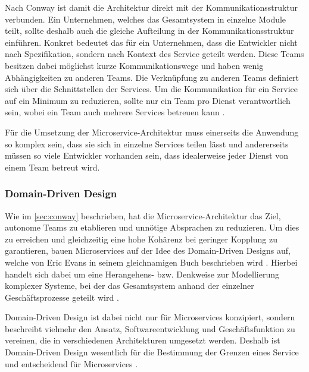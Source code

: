 Nach Conway ist damit die Architektur direkt mit der Kommunikationsstruktur verbunden. Ein Unternehmen, welches das Gesamtsystem in einzelne Module teilt, sollte deshalb auch die gleiche Aufteilung in der Kommunikationsstruktur einführen. Konkret bedeutet das für ein Unternehmen, dass die Entwickler nicht nach Spezifikation, sondern nach Kontext des Service geteilt werden. Diese Teams besitzen dabei möglichst kurze Kommunikationswege und haben wenig Abhängigkeiten zu anderen Teams. Die Verknüpfung zu anderen Teams definiert sich über die Schnittstellen der Services.
Um die Kommunikation für ein Service auf ein Minimum zu reduzieren, sollte nur ein Team pro Dienst verantwortlich sein, wobei ein Team auch mehrere Services betreuen kann \parencite[vgl.][Kap. 4.2]{wolff_microservices_2018}. 

Für die Umsetzung der Microservice-Architektur muss einerseits die Anwendung so komplex sein, dass sie sich in einzelne Services teilen lässt und andererseits müssen so viele Entwickler vorhanden sein, dass idealerweise jeder Dienst von einem Team betreut wird.

\subsubsection{Domain-Driven Design}
\label{sec:ddd}

Wie im \cref{sec:conway} beschrieben, hat die Microservice-Architektur das Ziel, autonome Teams zu etablieren und unnötige Absprachen zu reduzieren. Um dies zu erreichen und gleichzeitig eine hohe Kohärenz bei geringer Kopplung zu garantieren, bauen Microservices auf der Idee des Domain-Driven Designs auf, welche von Eric Evans in seinem gleichnamigen Buch beschrieben wird \parencite[vgl.][Kap. 2.4]{newman_monolith_2019}. Hierbei handelt sich dabei um eine Herangehens- bzw. Denkweise zur Modellierung komplexer Systeme, bei der das Gesamtsystem anhand der einzelner Geschäftsprozesse geteilt wird \parencite[vgl.][S. xix ff.]{evans_domain-driven_2003}.

Domain-Driven Design ist dabei nicht nur für Microservices konzipiert, sondern beschreibt vielmehr den Ansatz, Softwareentwicklung und Geschäftsfunktion zu vereinen, die in verschiedenen Architekturen umgesetzt werden. Deshalb ist Domain-Driven Design wesentlich für die Bestimmung der Grenzen eines Service und entscheidend für Microservices \parencite[vgl.][Kap. 4.3]{wolff_microservices_2018}.

